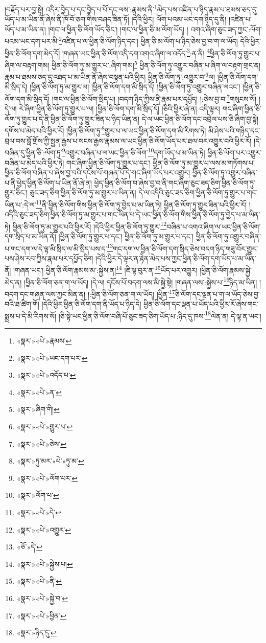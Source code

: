 །བརྗོད་པར་བྱ་སྟེ། འདིར་བྱེད་པ་དང་བྱེད་པ་པོ་དང་ལས་:རྣམས་ནི་\footnote{«སྣར་»«པེ་»རྣམས་}མེད་པས་འཛིན་པ་ཉིད་རྣམ་པ་ཐམས་ཅད་དུ་ཡོད་པ་མ་ཡིན་ནོ་ཞེས་ནི་ཁོ་བོ་ཅག་གིས་བཤད་ཟིན་ཏོ། །དེའི་ཕྱིར། ལོག་པའམ་ཡང་དག་ཉིད་དུ་ནི། །འཛིན་པ་ཡོད་པ་མ་ཡིན་ན། །གང་ལ་ཕྱིན་ཅི་ལོག་ཡོད་ཅིང་། །གང་ལ་ཕྱིན་ཅི་མ་ལོག་ཡོད། །
འགའ་ཞིག་ཅུང་ཟད་ཀྱང་:ལོག་པའམ་ཡང་དག་པར་མི་\footnote{«སྣར་»«པེ་»ཡང་དག་པར་}འཛིན་པ་ལ་ཕྱིན་ཅི་ལོག་ཉིད་དང་། ཕྱིན་ཅི་མ་ལོག་པ་ཉིད་ཅེས་བྱ་བ་ག་ལ་ཡོད། དེའི་ཕྱིར་ཕྱིན་ཅི་ལོག་དག་མེད་དོ། །གཞན་ཡང་ཕྱིན་ཅི་ལོག་འདི་དག་འགའ་ཞིག་ལ་འདོད་\footnote{«སྣར་»«པེ་»འདོད་པ་}:ན་ནི། \footnote{«སྣར་»«པེ་»ན་}ཕྱིན་ཅི་ལོག་ཏུ་གྱུར་པ་ཞིག་ལ་བརྟག་གམ། ཕྱིན་ཅི་ལོག་ཏུ་མ་གྱུར་པ་:ཞིག་གམ།\footnote{«སྣར་»ཞིག་གི།} ཕྱིན་ཅི་ལོག་ཏུ་འགྱུར་བཞིན་པ་ཞིག་ལ་བརྟག་གྲང་ན། རྣམ་པ་ཐམས་ཅད་དུ་འཐད་པ་མ་ཡིན་ནོ་ཞེས་བསྟན་པའི་ཕྱིར། ཕྱིན་ཅི་ལོག་ཏུ་:འགྱུར་བ་\footnote{«སྣར་»«པེ་»གྱུར་པ་}ལ། །ཕྱིན་ཅི་ལོག་དག་མི་སྲིད་དེ། །ཕྱིན་ཅི་ལོག་ཏུ་མ་གྱུར་ལ། །ཕྱིན་ཅི་ལོག་དག་མི་སྲིད་དོ། །ཕྱིན་ཅི་ལོག་ཏུ་འགྱུར་བཞིན་ལའང་། །ཕྱིན་ཅི་ལོག་དག་མི་སྲིད་དོ། །གང་ལ་ཕྱིན་ཅི་ལོག་སྲིད་པ། །བདག་ཉིད་ཀྱིས་ནི་རྣམ་པར་དཔྱོད། །:ཅེས་བྱ་བ་\footnote{«སྣར་»«པེ་»ཅེས་}གསུངས་སོ། །དེ་ལ། རེ་ཞིག་ཕྱིན་ཅི་ལོག་ཏུ་གྱུར་པ་ལ། །ཕྱིན་ཅི་ལོག་དག་མི་སྲིད་དོ། །ཅིའི་ཕྱིར་ཞེ་ན། འདི་ལྟར། གང་ཞིག་ཕྱིན་ཅི་ལོག་ཏུ་གྱུར་པ་དེ་ནི་ཕྱིན་ཅི་ལོག་ཏུ་གྱུར་ཟིན་པ་ཉིད་ཡིན་ན། དེ་ལ་ཡང་ཕྱིན་ཅི་ལོག་དང་འབྲེལ་པས་ཅི་ཞིག་བྱ་སྟེ། དགོས་པ་མེད་པའི་ཕྱིར་རོ། །ཕྱིན་ཅི་ལོག་ཏུ་\footnote{«སྣར་»ཏུ་མར་«པེ་»ཏུ་མ་}གྱུར་པ་ལ་ཡང་ཕྱིན་ཅི་ལོག་དག་མི་རིགས་ཏེ། མི་ཤེས་པའི་གཉིད་དང་བྲལ་བས་བློ་གྲོས་ཀྱི་སྤྱན་རྒྱས་པ་སངས་རྒྱས་རྣམས་ལ་ཡང་ཕྱིན་ཅི་ལོག་ཡོད་པར་ཐལ་བར་འགྱུར་བའི་ཕྱིར་རོ། །དེ་བཞིན་དུ་ཕྱིན་ཅི་:ལོག་ཏུ་\footnote{«སྣར་»«པེ་»ལོག་པར་}འགྱུར་བཞིན་པ་ལ་ཡང་ཕྱིན་ཅི་ལོག་\footnote{«སྣར་»ལོག་པ་}དག་ཡོད་པ་མ་ཡིན་ཏེ། ཕྱིན་ཅི་ལོག་པར་འགྱུར་བཞིན་པ་མེད་པའི་ཕྱིར་ཏེ། གང་ཞིག་ཕྱིན་ཅི་ལོག་ཏུ་གྱུར་པ་དང་། ཕྱིན་ཅི་ལོག་ཏུ་མ་གྱུར་པ་ལས་མ་གཏོགས་པ་ཕྱིན་ཅི་ལོག་བཞིན་པ་ཞེས་བྱ་བའི་དངོས་པོ་གཞན་པོ་དེ་གང་ཞིག་ཡོད་པར་འགྱུར། ཕྱིན་ཅི་ལོག་ཏུ་འགྱུར་བཞིན་པ་ནི་ཕྱེད་ཕྱིན་ཅི་ལོག་པ་ཡིན་ནོ་ཞེ་ན། ཕྱེད་ཕྱིན་ཅི་ལོག་བ་ཞེས་བྱ་བ་ནི་གང་ཞིག་ཅུང་ཟད་ཅིག་ཕྱིན་ཅི་ལོག་ཏུ་གྱུར་ཅིང་། ཅུང་ཟད་ཅིག་ཕྱིན་ཅི་ལོག་ཏུ་མ་གྱུར་པ་ཡིན་ན། དེ་ལ་འདིའི་ཅུང་ཟད་ཅིག་ཕྱིན་ཅི་ལོག་ཏུ་གྱུར་པ་གང་ཡིན་པ་:དེ་ལ་\footnote{«སྣར་»«པེ་»དེ་}ནི་ཕྱིན་ཅི་ལོག་གིས་ཕྱིན་ཅི་ལོག་ཏུ་བྱེད་པ་མ་ཡིན་ཏེ། ཕྱིན་ཅི་ལོག་ཏུ་གྱུར་ཟིན་པའི་ཕྱིར་རོ། །འདིའི་ཅུང་ཟད་ཅིག་ཕྱིན་ཅི་ལོག་ཏུ་མ་གྱུར་པ་གང་ཡིན་པ་དེ་ཡང་ཕྱིན་ཅི་ལོག་གིས་ཕྱིན་ཅི་ལོག་ཏུ་བྱེད་པ་མ་ཡིན་ཏེ། ཕྱིན་ཅི་ལོག་ཏུ་མ་གྱུར་པའི་ཕྱིར་རོ། །དེའི་ཕྱིར་ཕྱིན་ཅི་ལོག་ཏུ་གྱུར་\footnote{«སྣར་»«པེ་»འགྱུར་}བཞིན་པ་འགའ་ཞིག་ལ་ཡང་ཕྱིན་ཅི་ལོག་དག་སྲིད་པ་མ་ཡིན་ནོ། །ཕྱིན་ཅི་ལོག་ཏུ་གྱུར་པ་དང་། ཕྱིན་ཅི་ལོག་ཏུ་མ་གྱུར་པ་དང་། ཕྱིན་ཅི་ལོག་ཏུ་འགྱུར་བཞིན་པ་གང་དག་ལ་དེ་ལྟ་མི་སྲིད་ལ་མི་སྲིད་པས་ད་\footnote{«ཅོ་»དེ་}གང་དག་ལ་ཕྱིན་ཅི་ལོག་དག་སྲིད་ཅེས་བདག་ཉིད་གཟུ་བོར་གྱུར་པས་ཤེས་རབ་ཀྱིས་རྣམ་པར་དཔྱོད་ཅིག །དེའི་ཕྱིར་དེ་ལྟར་ན་རྟེན་མེད་པས་ཀྱང་ཕྱིན་ཅི་ལོག་དག་ཡོད་པ་མ་ཡིན་ནོ། །གཞན་ཡང་། ཕྱིན་ཅི་ལོག་རྣམས་མ་:སྐྱེས་ན།\footnote{«སྣར་»«པེ་»སྐྱེས་པ།} །ཇི་ལྟ་བུར་ན་\footnote{«སྣར་»«པེ་»ནི་}ཡོད་པར་འགྱུར། །ཕྱིན་ཅི་ལོག་རྣམས་སྐྱེ་མེད་ན། །ཕྱིན་ཅི་ལོག་ཅན་ག་ལ་ཡོད། །དེ་ལ། དངོས་པོ་བདག་ལས་མི་སྐྱེ་སྟེ། །གཞན་ལས་:སྐྱེས་པ་\footnote{«སྣར་»«པེ་»སྐྱེ་བ་}ཉིད་མ་ཡིན། །བདག་དང་གཞན་ལས་ཀྱང་མིན་ན། །:ཕྱིན་ཅི་ལོག་ཅན་ག་ལ་ཡོད། །ཕྱིན་\footnote{«སྣར་»«པེ་»ཕྱིན་}ཅི་ལོག་དང་ལྡན་པ་ག་ལ་ཡོད་ཅེས་བྱ་བའི་ཐ་ཚིག་གོ། །དེའི་ཕྱིར་ཕྱིན་ཅི་ལོག་དག་ནི་ཡོད་པ་ཉིད་དེ། ཕྱིན་ཅི་ལོག་དང་ལྡན་པ་ཡོད་པའི་ཕྱིར་རོ་ཞེས་གང་སྨྲས་པ་དེ་མི་རིགས་སོ། །ཅི་སྟེ་ཡང་ཕྱིན་ཅི་ལོག་བཞི་པོ་ཅུང་ཟད་ཅིག་ཡོད་པ་:ཉིད་དུ་ཁས་\footnote{«སྣར་»ཉིད་དུ་}ལེན་ན། དེ་ལྟ་ན་ཡང་། 